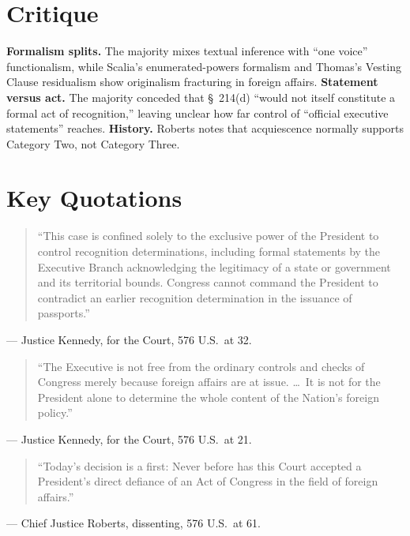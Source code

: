 \documentclass[12pt]{article}
\begin{document}
\section{Critique}

\textbf{Formalism splits.} The majority mixes textual inference with ``one voice'' functionalism, while Scalia's enumerated-powers formalism and Thomas's Vesting Clause residualism show originalism fracturing in foreign affairs. \textbf{Statement versus act.} The majority conceded that \S~214(d) ``would not itself constitute a formal act of recognition,'' leaving unclear how far control of ``official executive statements'' reaches. \textbf{History.} Roberts notes that acquiescence normally supports Category Two, not Category Three.

\section{Key Quotations}

\begin{quote}
``This case is confined solely to the exclusive power of the President to control recognition determinations, including formal statements by the Executive Branch acknowledging the legitimacy of a state or government and its territorial bounds. Congress cannot command the President to contradict an earlier recognition determination in the issuance of passports.''
\end{quote}
\noindent --- Justice Kennedy, for the Court, 576 U.S.\ at 32.

\begin{quote}
``The Executive is not free from the ordinary controls and checks of Congress merely because foreign affairs are at issue. \dots\ It is not for the President alone to determine the whole content of the Nation's foreign policy.''
\end{quote}
\noindent --- Justice Kennedy, for the Court, 576 U.S.\ at 21.

\begin{quote}
``Today's decision is a first: Never before has this Court accepted a President's direct defiance of an Act of Congress in the field of foreign affairs.''
\end{quote}
\noindent --- Chief Justice Roberts, dissenting, 576 U.S.\ at 61.
\end{document}
